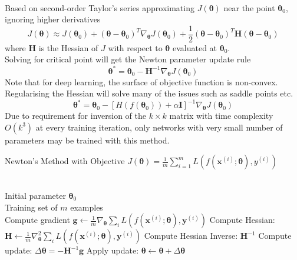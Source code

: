 \begin{remark} \\
Based on second-order Taylor's series approximating $J(\bm{\theta})$ near the point $\bm{\theta}_0$, ignoring higher derivatives
\begin{equation}
J(\bm{\theta}) \approx J(\bm{\theta}_0) + (\bm{\theta} - \bm{\theta}_0)^T \nabla_{\bm{\theta}} J(\bm{\theta}_0) + \frac{1}{2} (\bm{\theta} - \bm{\theta}_0)^T \bm{H}(\bm{\theta} - \bm{\theta}_0) \nonumber
\end{equation}
where $\bm{H}$ is the Hessian of $J$ with respect to $\bm{\theta}$ evaluated at $\bm{\theta}_0$.\\
Solving for critical point will get the Newton parameter update rule
\begin{equation}
\bm{\theta}^{*} = \bm{\theta}_0 - \bm{H}^{-1} \nabla_{\bm{\theta}} J(\bm{\theta}_0) \nonumber
\end{equation}
Note that for deep learning, the surface of objective function is non-convex. Regularising the Hessian will solve many of the issues such as saddle points etc.
\begin{equation}
\bm{\theta}^{*} = \bm{\theta}_0 - [H(f(\bm{\theta}_0)) + \alpha \bm{I}]^{-1} \nabla_{\bm{\theta}} J(\bm{\theta}_0) \nonumber
\end{equation}
Due to requirement for inversion of the $k \times k$ matrix with time complexity $O(k^3)$ at every training iteration, only networks with very small number of parameters may be trained with this method.
\end{remark}

\begin{breakablealgorithm}
\caption{Newton's Method with Objective $J(\bm{\theta}) = \frac{1}{m} \sum_{i=1}^m L(f(\bm{x}^{(i)}; \bm{\theta}), y^{(i)})$}
\begin{algorithmic}
\Require \\
Initial parameter $\bm{\theta}_0$\\
Training set of $m$ examples\\

\State Compute gradient $\bm{g} \leftarrow \frac{1}{m} \nabla_{\bm{\theta}} \sum_i L(f(\bm{x}^{(i)}; \bm{\theta}), \bm{y}^{(i)})$
\State Compute Hessian: $\bm{H} \leftarrow \frac{1}{m} \nabla_{\bm{\theta}}^2 \sum_i L(f(\bm{x}^{(i)}; \bm{\theta}), \bm{y}^{(i)})$
\State Compute Hessian Inverse: $\bm{H}^{-1}$
\State Compute update: $\Delta \bm{\theta} = - \bm{H}^{-1} \bm{g}$
\State Apply update: $\bm{\theta} \leftarrow \bm{\theta} + \Delta \bm{\theta}$
\EndWhile
\end{algorithmic}
\end{breakablealgorithm}

